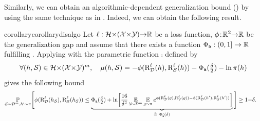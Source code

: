 \documentclass[twoside]{article}
\theoremstyle{plain}
\begin{document}
Similarly, we can obtain an algorithmic-dependent generalization bound () by using the same technique as in .
Indeed, we can obtain the following result.
\begin{restatable}{corollary}{corollarydisalgo} \label{corollary:dis-algo}
Let $\ell: \mathcal{H}{\times}(\mathcal{X}{\times}\mathcal{Y}){\to}\mathbb{R}$ be a loss function, $\phi\!:\! \mathbb{R}^2{\to}\mathbb{R}$ be the generalization gap and assume that there exists a function $\Phi_{{\tt a}}: (0,1]\to\mathbb{R}$ fulfilling .
Applying  with the parametric function $\comp$ defined by
\begin{align*}
    \forall (h,\mathcal{S})\in\mathcal{H}{\times}(\mathcal{X}{\times}\mathcal{Y})^m,\quad \operatorname{\mu}(h, \mathcal{S}) = -\phi(\text{R}^{\ell}_{\mathcal{D}}(h),\text{R}^{\ell}_{\mathcal{S}}(h))  -\Phi_{{\tt a}}(\tfrac{\delta}{2}) -\ln\pi(h)
\end{align*}
gives the following bound 
\begin{align}
    \PP_{\Scal\sim\Dcal^m, h'\sim\P}&\Bigg[ \phi(\RiskLoss_{\Dcal}(h_{\Scal}),\RiskLoss_{\Scal}(h_{\Scal})) \le \underbrace{\PhiA(\tfrac{\delta}{2}) + \ln\!\left[\frac{16}{\delta^2} \EE_{\Vcal\!{\sim}\Dcal^m}\EE_{g{\sim}\P} e^{\phi(\RiskLoss_{\Dcal}(g),\RiskLoss_{\Vcal}(g))-\phi(\RiskLoss_{\Dcal}(h'),\RiskLoss_{\Scal}(h'))}\right]}_{\defeq\ \PhiA'(\delta)} \Bigg] \ge 1{-}\delta.\label{eq:bound-dis-algo}
\end{align}
\end{restatable}
\end{document}
